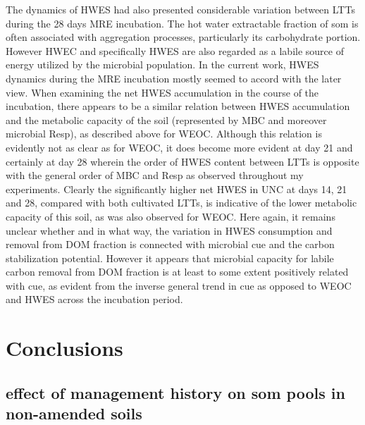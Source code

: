 \documentclass[12pt]{report}
\begin{document}
		
		The dynamics of HWES had also presented considerable variation between LTTs during the 28 days MRE incubation. The hot water extractable fraction of \gls{som} is often associated with aggregation processes, particularly its carbohydrate portion.  However HWEC and specifically HWES are also regarded as a labile source of energy utilized by the microbial population. In the current work, HWES dynamics during the MRE incubation mostly seemed to accord with the later view. When examining the net HWES accumulation in the course of the incubation, there appears to be a similar relation between HWES accumulation and the metabolic capacity of the soil (represented by MBC and moreover microbial Resp), as described above for WEOC. Although this relation is evidently not as clear as for WEOC, it does become more evident at day 21 and certainly at day 28 wherein the order of HWES content between LTTs is opposite with the general order of MBC and Resp as observed throughout my experiments. Clearly the significantly higher net HWES in UNC at days 14, 21 and 28, compared with both cultivated LTTs, is indicative of the lower metabolic capacity of this soil, as was also observed for WEOC. Here again, it remains unclear whether and in what way, the variation in HWES consumption and removal from DOM fraction is connected with microbial \gls{cue} and the carbon stabilization potential. However it appears that microbial capacity for labile carbon removal from DOM fraction is at least to some extent positively related with \gls{cue}, as evident from the inverse general trend in \gls{cue} as opposed to WEOC and HWES across the incubation period.
		

	\chapter{Conclusions}
		
		
		
		
		\section{effect of management history on \gls{som} pools in non-amended soils}
		
\end{document}
